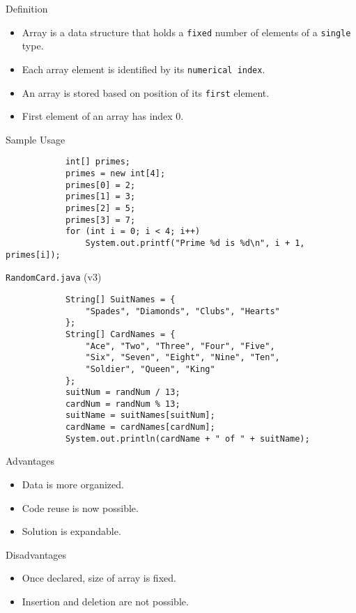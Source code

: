 \documentclass[10pt, compress]{beamer}
\begin{document}
\begin{slide}
	\begin{block}{Definition}
		\begin{itemize}
			\item[] Array is a data structure that holds a \texttt{fixed} number of elements of a \texttt{single} type.
			\item[] Each array element is identified by its \texttt{numerical index}.
			\item[] An array is stored based on position of its \texttt{first} element.
			\item[] First element of an array has index 0.
		\end{itemize}
	\end{block}
\end{slide}

\begin{slide}
	\begin{block}{Sample Usage}
		\begin{verbatim}
			int[] primes;
			primes = new int[4];
			primes[0] = 2;
			primes[1] = 3;
			primes[2] = 5;
			primes[3] = 7;
			for (int i = 0; i < 4; i++)
			    System.out.printf("Prime %d is %d\n", i + 1, primes[i]);
		\end{verbatim}
	\end{block}
\end{slide}

\begin{slide}
	\begin{block}{\texttt{RandomCard.java} (v3)}
		\begin{verbatim}
			String[] SuitNames = {
			    "Spades", "Diamonds", "Clubs", "Hearts"
			};
			String[] CardNames = {
			    "Ace", "Two", "Three", "Four", "Five",
			    "Six", "Seven", "Eight", "Nine", "Ten",
			    "Soldier", "Queen", "King"
			};
			suitNum = randNum / 13;
			cardNum = randNum % 13;
			suitName = suitNames[suitNum];
			cardName = cardNames[cardNum];
			System.out.println(cardName + " of " + suitName);
		\end{verbatim}
	\end{block}
\end{slide}

\begin{slide}
	\begin{block}{Advantages}
		\begin{itemize}
			\item[] Data is more organized.
			\item[] Code reuse is now possible.
			\item[] Solution is expandable.
		\end{itemize}
	\end{block}
	\begin{block}{Disadvantages}
		\begin{itemize}
			\item[] Once declared, size of array is fixed.
			\item[] Insertion and deletion are not possible.
		\end{itemize}
	\end{block}
\end{slide}
\end{document}
